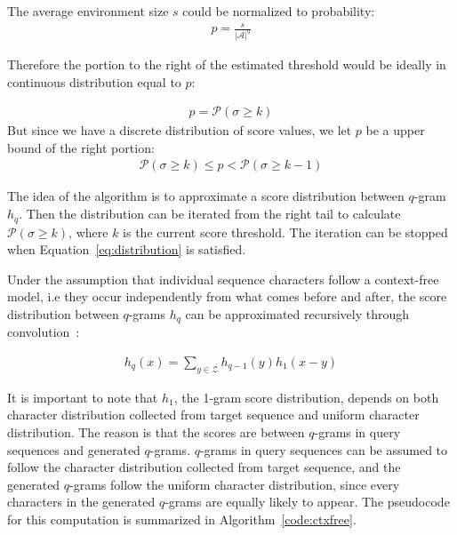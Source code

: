 \documentclass[twoside,a4paper,bsc]{master}
\newcommand{\Qgram}[1]{\(#1\)-gram}
\newcommand{\Alpha}[0]{\mathcal{A}}
\begin{document}
The average environment size \(s\) could be normalized to
probability:
\begin{align}
p = \frac{s}{|\Alpha|^q}
\end{align}

Therefore the portion to the right of the estimated threshold would be ideally 
in continuous distribution equal to \(p\):

\begin{align}
p = \mathcal{P}(\sigma \geq k)
\end{align}
But since we have a discrete distribution of score values, we let \(p\) be
a
upper bound of the right portion:
\begin{align}
\mathcal{P}(\sigma \geq k) \leq p < \mathcal{P}(\sigma \geq
k-1)\label{eq:distribution}
\end{align}

The idea of the algorithm is to approximate a score distribution between
\Qgram{q} \(h_q\). Then the distribution can be iterated from the right tail to
calculate \(\mathcal{P}(\sigma \geq k)\), where \(k\) is the current score
threshold. The iteration can be stopped when Equation~\ref{eq:distribution}
is satisfied.

Under the assumption that individual sequence characters follow a
context-free model, i.e they occur independently from what comes before and 
after, the score distribution between \Qgram{q}s \(h_q\) can be approximated
recursively
through convolution~\cite{dmsv}:

\begin{align}
h_{q}(x) = \sum_{y\in\mathcal{Z}} h_{q-1}(y)h_1(x-y)
\label{eq:convolution}
\end{align}

It is important to note that \(h_1\), the 1-gram score distribution,
depends on both character distribution collected from target sequence and
uniform character distribution. The reason is that the scores are between
\Qgram{q}s in query sequences and generated \Qgram{q}s. \Qgram{q}s in query
sequences can be assumed to follow the character distribution collected
from
target sequence, and the generated \Qgram{q}s follow the uniform character
distribution, since every characters in the generated \Qgram{q}s are
equally
likely to appear. The pseudocode for this computation is
summarized in Algorithm~\ref{code:ctxfree}.
\end{document}

